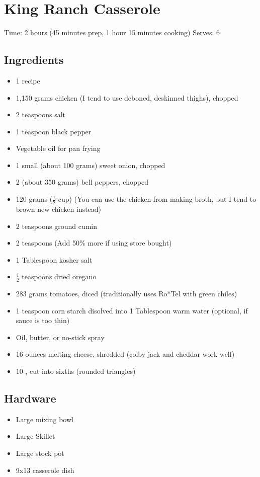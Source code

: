 \section{King Ranch Casserole}
\label{kingRanchCasserole}
\setcounter{secnumdepth}{0}
Time: 2 hours (45 minutes prep, 1 hour 15 minutes cooking)
Serves: 6

\begin{multicols}{2}
\subsection*{Ingredients}
\begin{itemize}
    \item 1 recipe 
    \item 1,150 grams chicken (I tend to use deboned, deskinned thighs), chopped
    \item 2 teaspoons salt
    \item 1 teaspoon black pepper
    \item Vegetable oil for pan frying
    \item 1 small (about 100 grams) sweet onion, chopped
    \item 2 (about 350 grams) bell peppers, chopped
    \item 120 grams (\( \frac{1}{2} \) cup)  (You can use the chicken from making broth, but I tend to brown new chicken instead)
    \item 2 teaspoons ground cumin
    \item 2 teaspoons  (Add 50\% more if using store bought)
    \item 1 Tablespoon kosher salt
    \item \( \frac{1}{2} \) teaspoons dried oregano
    \item 283 grams tomatoes, diced (traditionally uses Ro*Tel with green chiles)
    \item 1 teaspoon corn starch disolved into 1 Tablespoon warm water (optional, if sauce is too thin)
    \item Oil, butter, or no-stick spray
    \item 16 ounces melting cheese, shredded (colby jack and cheddar work well)
    \item 10 , cut into sixths (rounded triangles)
\end{itemize}

\subsection*{Hardware}
\begin{itemize}
    \item Large mixing bowl
    \item Large Skillet
    \item Large stock pot
    \item 9x13 casserole dish
\end{itemize}
\clearpage


\end{multicols}
